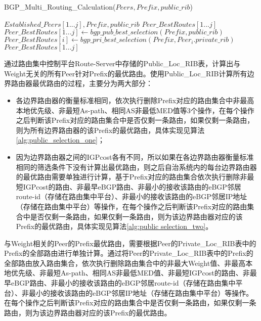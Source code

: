 \begin{algorithm}[htb]
    \caption{BGP\_Multi\_Routing\_Calculation($Peers, Prefix, public\_rib$)}%
    \label{alg:multi_routing_calculation}
    \begin{algorithmic}[1]%
        \REQUIRE
        $Established\_Peers[1...j], Prefix, public\_rib$
        \ENSURE
        $Peer\_BestRoutes[1...j]$
        \STATE $Peer\_BestRoutes[1...j] \gets  bgp\_pub\_best\_selection(Prefix, public\_rib)$
        \STATE $Peer\_BestRoutes[i] \gets  bgp\_pri\_best\_selection(Prefix, Peer_i.private\_rib)$
        \ENDIF
        \ENDFOR
        \RETURN $Peer\_BestRoutes[1...j]$
    \end{algorithmic}
\end{algorithm}

通过路由集中控制平台Route-Server中存储的Public\_Loc\_RIB表，计算出与Weight无关的所有Peer针对Prefix的最优路由。使用Public\_Loc\_RIB计算所有边界路由器最优路由的过程，主要分为两大部分：
\begin{itemize}
  \item 各边界路由器的衡量标准相同，依次执行删除Prefix对应的路由集合中非最高本地优先级、非最短As-path、相同AS非最低MED值等3个操作，在每个操作之后判断该Prefix对应的路由集合中是否仅剩一条路由，如果仅剩一条路由，则为所有边界路由器的该Prefix的最优路由，具体实现见算法\ref{alg:public_selection_one}；
  \item 因为边界路由器之间的IGPcost各有不同，所以如果在各边界路由器衡量标准相同的筛选条件下没有计算出最优路由，则之后自治系统内的每台边界路由器的最优路由需要单独进行计算，基于Prefix对应的路由集合依次执行删除非最短IGPcost的路由、非最早eBGP路由、非最小的接收该路由的eBGP邻居route-id（存储在路由集中平台）、非最小的接收该路由的eBGP邻居IP地址（存储在路由集中平台）等操作，在每个操作之后判断该Prefix对应的路由集合中是否仅剩一条路由，如果仅剩一条路由，则为该边界路由器对应的该Prefix的最优路由，具体实现见算法\ref{alg:public selection_two}。\\
\end{itemize}


与Weight相关的Peer的Prefix最优路由，需要根据Peer的Private\_Loc\_RIB表中的Prefix的全部路由进行单独计算。通过将Peer的Private\_Loc\_RIB表中的Prefix的全部路由放入路由集合，依次执行删除路由集合中的非最大Weight值、非最高本地优先级、非最短As-path、相同AS非最低MED值、非最短IGPcost的路由、非最早eBGP路由、非最小的接收该路由的eBGP邻居route-id（存储在路由集中平台）、非最小的接收该路由的eBGP邻居IP地址（存储在路由集中平台）等操作。在每个操作之后判断该Prefix对应的路由集合中是否仅剩一条路由，如果仅剩一条路由，则为该边界路由器对应的该Prefix的最优路由。

